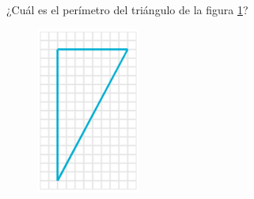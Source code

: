 
¿Cuál es el perímetro del triángulo de la figura \ref{fig:peri_rect_03}?
\begin{figure}[H]
    \begin{center}
        \includegraphics[width=0.3\textwidth]{../images/peri_rect_03.png}
    \end{center}
    \caption{}
    \label{fig:peri_rect_03}
\end{figure}